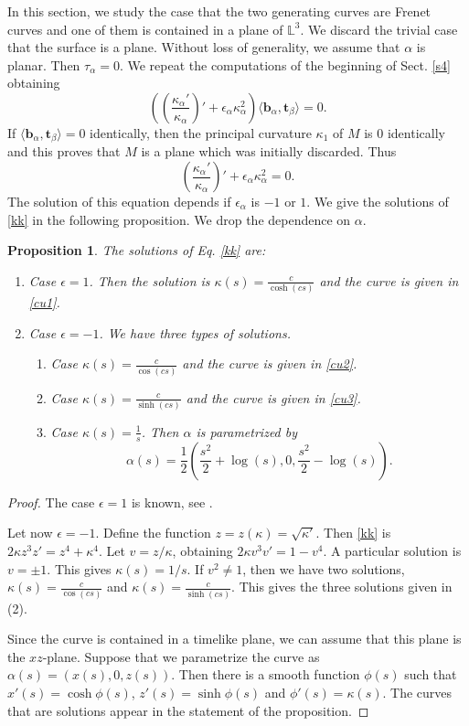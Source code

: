 \documentclass[a4paper,12pt]{amsart}
\numberwithin{equation}{section}
\newtheorem{proposition}[theorem]{Proposition}
\theoremstyle{definition}
\def\rr{\mathbb L}
\def\t{\mathbf t}
\def\b{\mathbf b}
\begin{document}
 In this section, we study the case that the two generating curves are   Frenet curves and one of them is contained in a plane of $\rr^3$.  We discard the trivial case that the surface is a plane. Without loss of generality, we assume that $\alpha$ is planar. Then  $\tau_\alpha=0$.  We repeat the computations of the beginning of Sect. \ref{s4} obtaining
\begin{equation}\label{eq5}
\left(\left(\frac{\kappa_\alpha'}{\kappa_\alpha}\right)'+\epsilon_\alpha\kappa_\alpha^2\right) \langle  \b_\alpha,\t_\beta\rangle=0.
\end{equation}
If $\langle\b_\alpha,\t_\beta\rangle=0$ identically, then the principal curvature $\kappa_1$ of $M$ is $0$ identically and this proves that   $M$ is a plane which was initially discarded. Thus 
\begin{equation}\label{kk}
\left(\frac{\kappa_\alpha'}{\kappa_\alpha}\right)'+\epsilon_\alpha\kappa_\alpha^2=0.
\end{equation}
The solution of this equation depends if $\epsilon_\alpha$ is $-1$ or $1$. We give the  solutions of \eqref{kk} in the following proposition. We drop the dependence on $\alpha$.

\begin{proposition} \label{pr3}
The solutions of Eq. \eqref{kk} are:
\begin{enumerate} 
\item Case $\epsilon=1$. Then the solution  is $\kappa(s)=\frac{c}{\cosh(cs)}$ and the curve is given in \eqref{cu1}. 
\item Case $\epsilon=-1$. We have three types of solutions.
\begin{enumerate}
\item Case $\kappa(s)=\frac{c}{\cos(cs)}$  and the curve is given in \eqref{cu2}.
\item Case $\kappa(s)=\frac{c}{\sinh(cs)}$ and the curve is given in \eqref{cu3}. 
\item Case $\kappa(s)=\frac{1}{s}$. Then $\alpha$ is parametrized by  
$$\alpha(s)=\frac{1}{2}\left(\frac{s^2}{2}+\log(s),0, \frac{s^2}{2}-\log(s)\right).$$
\end{enumerate}
\end{enumerate}
\end{proposition}
\begin{proof}
The case $\epsilon=1$  is known, see \cite{hl}. 


Let now $\epsilon=-1$.    Define the function $z=z(\kappa)=\sqrt{\kappa'}$.   Then \eqref{kk} is $2\kappa z^3z'=z^4+\kappa^4$. Let $v=z/\kappa$, obtaining 
$2\kappa v^3v'=1-v^4$. A particular solution is $v=\pm 1$. This gives $\kappa(s)=1/s$. If $v^2\not=1$, then we have two solutions, $\kappa(s)= \frac{c}{\cos(cs)}$ and $\kappa(s)= \frac{c}{\sinh(cs)}$. This gives the three solutions given in  (2). 

Since the curve is contained in a timelike plane, we can assume that this plane is the $xz$-plane. Suppose that we parametrize the curve  as 
$\alpha(s)=(x(s),0,z(s))$. Then there is a smooth function $\phi(s)$ such that  $x'(s)=\cosh\phi(s)$, $z'(s)=\sinh\phi(s)$ and $\phi'(s)=\kappa(s)$. The curves that are solutions appear   in the statement of the proposition. 
\end{proof}
\end{document}
